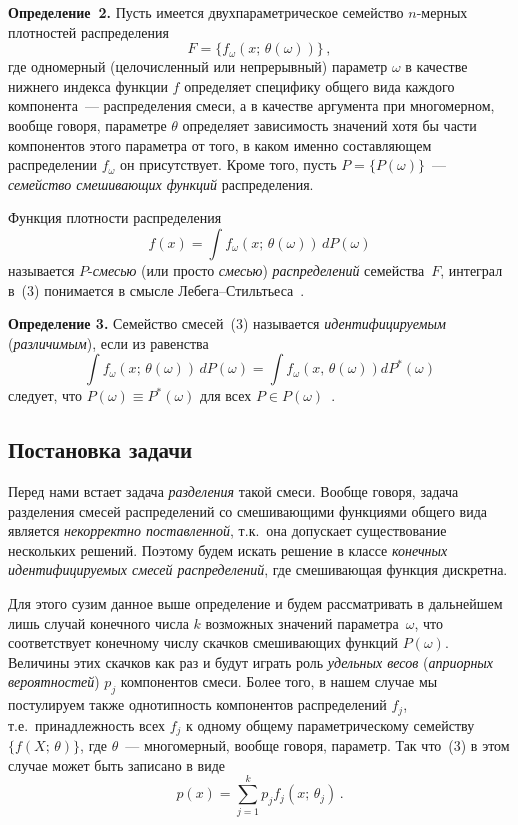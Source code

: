 \begin{multicols}{2}
\medskip
\textbf{Определение~2.} Пусть имеется двух\-па\-ра\-мет\-ри\-че\-ское
семейство $n$-мерных плотностей  распределения
\begin{equation}
F = \{ f_\omega (x;\, \theta (\omega ))\}\,,
\end{equation}
где одномерный (целочисленный или непрерывный) параметр $\omega$ в
качестве нижнего индекса функции $f$ определяет специфику общего вида
каж\-до\-го компонента~--- распределения смеси, а в качестве аргумента при
многомерном, вообще говоря, параметре $\theta$ определяет зависимость
значений хотя бы части компонентов этого параметра от того, в каком именно
составляющем распределении $f_\omega$ он присутствует. Кроме того, пусть
$P = \{P(\omega )\}$~--- \textit{семейство смешивающих функций}
распределения.

Функция плотности распределения
\begin{equation}
f(x) = \int f_\omega (x;\,\theta(\omega ))\,dP (\omega )
\end{equation}
называется $P$-\textit{смесью} (или просто \textit{смесью})
\textit{распределений} семейства~$F$,  интеграл в~(3) понимается в смысле
Лебега--Стильтьеса~\cite{3bat}.

\medskip
\textbf{Определение 3.} Семейство смесей~(3) называется
\textit{идентифицируемым} (\textit{различимым}), если из равенства
$$
\int f_\omega (x;\,\theta(\omega ))\,dP (\omega ) =\int f_\omega
(x,\,\theta(\omega )) dP^*(\omega )
$$
следует, что $P(\omega ) \equiv P^*(\omega )$ для всех $P \in P(\omega
)$~\cite{3bat}.

\subsection{Постановка задачи} %

Перед нами встает задача \textit{разделения} такой смеси. Вообще говоря,
задача разделения смесей распределений со смешивающими функциями
общего вида является \textit{некорректно поставленной}, т.к.\ она допускает
существование нескольких решений. Поэтому будем искать решение в классе
\textit{конечных идентифицируемых смесей распределений}, где смешивающая
функция дискретна.

Для этого сузим данное выше определение и будем рассматривать в дальнейшем лишь 
случай конечного числа $k$ возможных значений па\-ра\-мет\-ра~$\omega$, что 
соответствует конечному числу скачков смешивающих функций $P(\omega )$.  
Величины этих скачков как раз и будут играть роль \textit{удельных весов} 
(\textit{априорных вероятностей}) $p_j$ компонентов смеси. Более того, в нашем 
случае мы постулируем также однотипность компонентов распределений $f_j$, т.е.\ 
принадлежность всех $f_j$ к одному общему па\-ра\-мет\-ри\-че\-ско\-му 
семейству $\{ f(X;\,\theta )\}$, где $\theta$~--- многомерный, вообще говоря, 
параметр. Так что~(3) в этом случае может быть записано в виде
\begin{equation} %
p(x) = \sum\limits^k_{j=1} p_j f_j (x;\,\theta_j )\,.
\end{equation}


\end{multicols}

